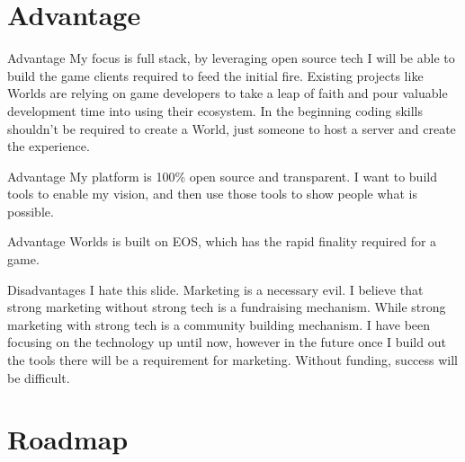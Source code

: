 \documentclass[final, xcolor=pdftex, dvipsnames, table, aspectratio=169, 14pt]{beamer}
\begin{document}
\section{Advantage}
\begin{frame}{Advantage}
My focus is full stack, by leveraging open source tech I will be able to build the game clients required to feed the initial fire. Existing projects like Worlds are relying on game developers to take a leap of faith and pour valuable development time into using their ecosystem. In the beginning coding skills shouldn't be required to create a World, just someone to host a server and create the experience. 
\end{frame}

\begin{frame}{Advantage}
My platform is 100\% open source and transparent. I want to build tools to enable my vision, and then use those tools to show people what is possible.
\end{frame}

\begin{frame}{Advantage}
Worlds is built on EOS, which has the rapid finality required for a game. 
\end{frame}

\begin{frame}{Disadvantages}
I hate this slide. Marketing is a necessary evil. I believe that strong marketing without strong tech is a fundraising mechanism. While strong marketing with strong tech is a community building mechanism. I have been focusing on the technology up until now, however in the future once I build out the tools there will be a requirement for marketing. Without funding, success will be difficult.  
\end{frame}

\section{Roadmap}
\end{document}
